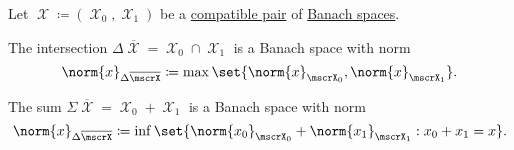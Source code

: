\begin{proposition}\label{def:banach_space_sum_and_intersection_norms}\mcite\cite[24]{Bergh1976}
  Let \( \mscrX \coloneqq (\mscrX_0, \mscrX_1) \) be a \hyperref[def:interpolated_topological_vector_space/compatibility]{compatible pair} of \hyperref[def:banach_space]{Banach spaces}.

  \begin{propenum}
     The intersection \( \Delta \overline{\mscrX} = \mscrX_0 \cap \mscrX_1 \) is a Banach space with norm
    \begin{equation}\label{eq:def:banach_space_sum_and_intersection_norms/intersection}
      \norm{x}_{\Delta \overline{\mscrX}} \coloneqq \max \set{ \norm{x}_{\mscrX_0}, \norm{x}_{\mscrX_1} }.
    \end{equation}

     The sum \( \Sigma \overline{\mscrX} = \mscrX_0 + \mscrX_1 \) is a Banach space with norm
    \begin{equation}\label{eq:def:banach_space_sum_and_intersection_norms/sum}
      \norm{x}_{\Delta \overline{\mscrX}} \coloneqq \inf \set{ \norm{x_0}_{\mscrX_0} + \norm{x_1}_{\mscrX_1} : x_0 + x_1 = x }.
    \end{equation}
  \end{propenum}
\end{proposition}
